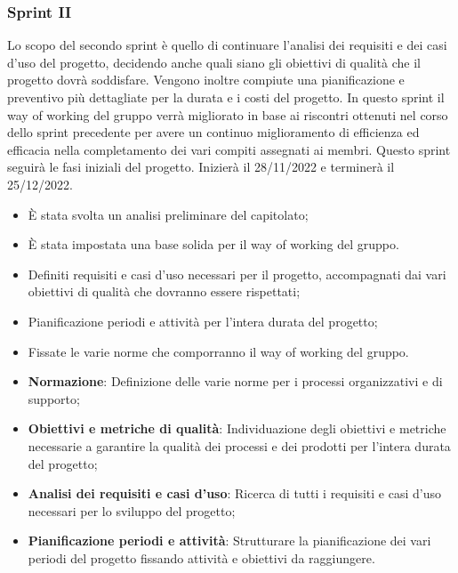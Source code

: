 \subsubsection{Sprint II}\:
Lo scopo del secondo sprint è quello di continuare l'analisi dei requisiti e dei casi d'uso del progetto, decidendo anche quali siano gli obiettivi di qualità che il progetto dovrà soddisfare. Vengono inoltre compiute una pianificazione e preventivo più dettagliate per la durata e i costi del progetto. In questo sprint il way of working del gruppo verrà migliorato in base ai riscontri ottenuti nel corso dello sprint precedente per avere un continuo miglioramento di efficienza ed efficacia nella completamento dei vari compiti assegnati ai membri.
Questo sprint seguirà le fasi iniziali del progetto. Inizierà il 28/11/2022 e terminerà il 25/12/2022.

\:
\begin{itemize}
	\item È stata svolta un analisi preliminare del capitolato;
	\item È stata impostata una base solida per il way of working del gruppo.
\end{itemize}

\:
\begin{itemize}
	\item Definiti requisiti e casi d'uso necessari per il progetto, accompagnati dai vari obiettivi di qualità che dovranno essere rispettati;
	\item Pianificazione periodi e attività per l'intera durata del progetto;
	\item Fissate le varie norme che comporranno il way of working del gruppo.
\end{itemize}

\:
\begin{itemize}
	\item \textbf{Normazione}: Definizione delle varie norme per i processi organizzativi e di supporto;
	\item \textbf{Obiettivi e metriche di qualità}: Individuazione degli obiettivi e metriche necessarie a garantire la qualità dei processi e dei prodotti per l'intera durata del progetto;
	\item \textbf{Analisi dei requisiti e casi d'uso}: Ricerca di tutti i requisiti e casi d'uso necessari per lo sviluppo del progetto;
	\item \textbf{Pianificazione periodi e attività}: Strutturare la pianificazione dei vari periodi del progetto fissando attività e obiettivi da raggiungere.
\end{itemize}

